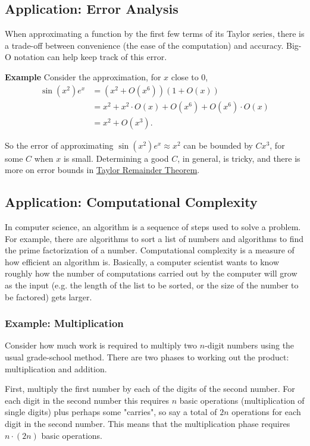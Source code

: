 \documentclass[twoside,openright,titlepage,a4paper]{book}
\begin{document}
\begin{sloppypar}
\subsection{Application: Error Analysis}

When approximating a function by the first few terms of its Taylor series, there is a trade-off between convenience (the ease of the computation) and accuracy. Big-O notation can help keep track of this error.

\textbf{Example} Consider the approximation, for $x$ close to 0,
\begin{align*}
\sin(x^2)e^x &= \left(x^2 + O(x^6)\right)(1 + O(x)) \\
& = x^2 + x^2 \cdot O(x) + O(x^6) + O(x^6)\cdot O(x) \\
& = x^2 + O(x^3). 
\end{align*}

So the error of approximating $\sin(x^2)e^x \approx x^2$ can be bounded by $Cx^3$, for some $C$ when $x$ is small. Determining a good $C$, in general, is tricky, and there is more on error bounds in \hyperref[ChTaylorRemainderTheorem]{Taylor Remainder Theorem}.

\subsection{Application: Computational Complexity}

In computer science, an algorithm is a sequence of steps used to solve a problem. For example, there are algorithms to sort a list of numbers and algorithms to find the prime factorization of a number. Computational complexity is a measure of how efficient an algorithm is. Basically, a computer scientist wants to know roughly how the number of computations carried out by the computer will grow as the input (e.g. the length of the list to be sorted, or the size of the number to be factored) gets larger.

\subsubsection{Example: Multiplication}

Consider how much work is required to multiply two $n$-digit numbers using the usual grade-school method. There are two phases to working out the product: multiplication and addition.

First, multiply the first number by each of the digits of the second number. For each digit in the second number this requires $n$ basic operations (multiplication of single digits) plus perhaps some "carries", so say a total of $2n$ operations for each digit in the second number. This means that the multiplication phase requires $n \cdot (2n)$ basic operations.


\end{sloppypar}
\end{document}
